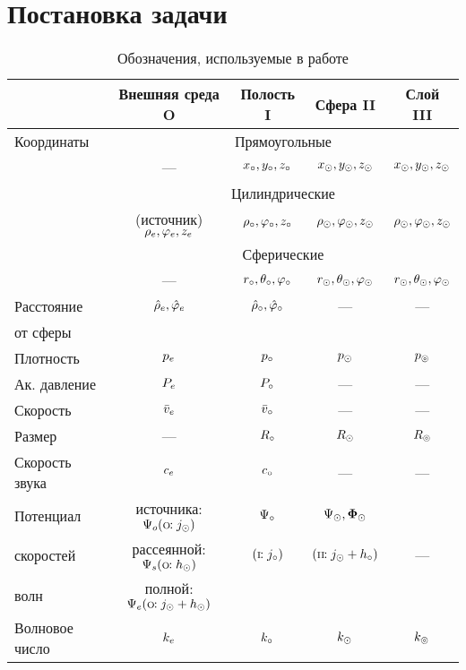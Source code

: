 \section{Постановка задачи} 
\begin{table}[h]
\begin{tabular}{|l|c|c|c|c|}
\hline
 &Внешняя среда \scriptsize{O} &Полость \scriptsize{I} &Сфера \scriptsize{II}&Слой \scriptsize{III}\\
\hline
Координаты &\multicolumn{4}{|c|}{Прямоугольные}\\
\cline{2-5}
& --- & $x_\circ, y_\circ, z_\circ$ & $x_\odot, y_\odot, z_\odot$ & $x_\odot, y_\odot, z_\odot$\\
\cline{2-5}
&\multicolumn{4}{|c|}{Цилиндрические}\\
\cline{2-5}
&(источник) $\rho_e, \varphi_e, z_e$ & $\rho_\circ, \varphi_\circ, z_\circ$ & $\rho_\odot, \varphi_\odot, z_\odot$ & $\rho_\odot, \varphi_\odot, z_\odot$\\
\cline{2-5}
&\multicolumn{4}{|c|}{Сферические}\\
\cline{2-5}
& --- & $r_\circ, \theta_\circ, \varphi_\circ$ & $r_\odot, \theta_\odot, \varphi_\odot$ & $r_\odot, \theta_\odot, \varphi_\odot$\\
\hline
Расстояние & $\hat{\rho}_e, \hat{\varphi}_e$ & $\hat{\rho}_\circ, \hat{\varphi}_\circ$ & --- & ---\\
от сферы &&&&\\
\hline
Плотность &$p_e$ &$p_\circ$ &$p_\odot$ &$p_\circledcirc$\\
\hline
Ак. давление &$P_e$ &$P_\circ$ & --- & ---\\
\hline
Скорость &$\bar{v}_e$ &$\bar{v}_\circ$ & --- & ---\\
\hline
Размер & --- & $R_\circ$ & $R_\odot$ & $R_\circledcirc$\\
\hline
Скорость звука & $c_e
$ & $c_\circ$ & --- & ---\\
\hline
Потенциал & источника: $\Psi_o (\text{\scriptsize{O}}\!\!: j_\odot)$ &$\Psi_\circ$ & $\Psi_\odot, \mathbf{\Phi}_\odot$ & \\
скоростей&рассеянной: $\Psi_s(\text{\scriptsize{O}}\!\!: h_\odot)$& $(\text{\scriptsize{I}}\!\!: j_\circ)$ &$(\text{\scriptsize{II}}\!\!: j_\odot + h_\circ)$ & --- \\
волн&полной: $\Psi_e (\text{\scriptsize{O}}\!\!: j_\odot + h_\odot)$&&&\\
\hline
Волновое число &$k_e$ &$k_\circ$ &$k_\odot$ &$k_\circledcirc$\\
\hline
\end{tabular}
\caption{Обозначения, используемые в работе}
\end{table}

\newpage

